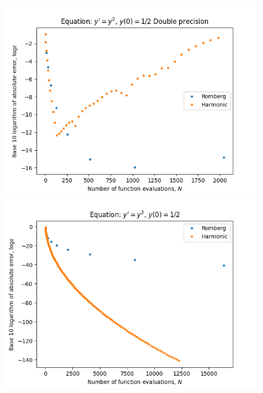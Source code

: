 \begin{figure}[H]
\centering
\begin{minipage}{0.45\textwidth}
\centering
\includegraphics[scale=0.45]{../results/emr_plots/singularity_0.png}
\end{minipage}
\begin{minipage}{0.45\textwidth}
\centering
\includegraphics[scale=0.45]{../results/emr_plots/singularity_0_hp.png}
\end{minipage}
\end{figure}

